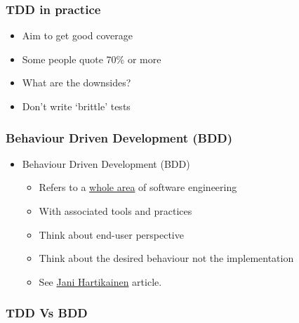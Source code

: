 \subsubsection{TDD in practice}\label{tdd-in-practice}

\begin{itemize}
\itemsep1pt\parskip0pt
\item
  Aim to get good coverage
\item
  Some people quote 70\% or more
\item
  What are the downsides?
\item
  Don't write `brittle' tests
\end{itemize}

\subsubsection{Behaviour Driven Development
(BDD)}\label{behaviour-driven-development-bdd}

\begin{itemize}
\itemsep1pt\parskip0pt
\item
  Behaviour Driven Development (BDD)

  \begin{itemize}
  \itemsep1pt\parskip0pt
  \item
    Refers to a
    \href{https://en.wikipedia.org/wiki/Behavior-driven_development}{whole
    area} of software engineering
  \item
    With associated tools and practices
  \item
    Think about end-user perspective
  \item
    Think about the desired behaviour not the implementation
  \item
    See
    \href{https://codeutopia.net/blog/2015/03/01/unit-testing-tdd-and-bdd/}{Jani
    Hartikainen} article.
  \end{itemize}
\end{itemize}

\subsubsection{TDD Vs BDD}\label{tdd-vs-bdd}

